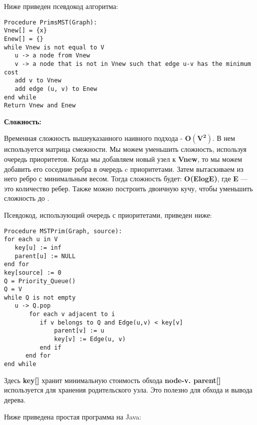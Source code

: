 \vspace{\baselineskip}

Ниже приведен псевдокод алгоритма:

\begin{tcolorbox}
\begin{verbatim}
Procedure PrimsMST(Graph):
Vnew[] = {x}
Enew[] = {}
while Vnew is not equal to V
   u -> a node from Vnew
   v -> a node that is not in Vnew such that edge u-v has the minimum cost
   add v to Vnew
   add edge (u, v) to Enew
end while
Return Vnew and Enew
\end{verbatim}
\end{tcolorbox}

\textbf{Сложность:}

\vspace{\baselineskip}

Временная сложность вышеуказанного наивного подхода - $\mathbf{O(V^2)}$. В нем используется матрица смежности. Мы можем уменьшить сложность, используя очередь приоритетов. Когда мы добавляем новый узел к \textbf{Vnew}, то мы можем добавить его соседние ребра в очередь c приоритетами. Затем вытаскиваем из него ребро с минимальным весом. Тогда сложность будет: \textbf{O(ElogE)}, где \textbf{E} — это количество ребер. Также можно построить двоичную кучу, чтобы уменьшить сложность до .

\vspace{\baselineskip}

Псевдокод, использующий очередь с приоритетами, приведен ниже:

\begin{tcolorbox}
\begin{verbatim}
Procedure MSTPrim(Graph, source):
for each u in V
   key[u] := inf
   parent[u] := NULL
end for
key[source] := 0
Q = Priority_Queue()
Q = V
while Q is not empty
   u -> Q.pop
       for each v adjacent to i
          if v belongs to Q and Edge(u,v) < key[v]
              parent[v] := u
              key[v] := Edge(u, v)
          end if
      end for
end while
\end{verbatim}
\end{tcolorbox}

Здесь \textbf{key[]} хранит минимальную стоимость обхода \textbf{node-v. parent[]} используется для хранения родительского узла. Это полезно для обхода и вывода дерева.

\vspace{\baselineskip}

Ниже приведена простая программа на Java:

